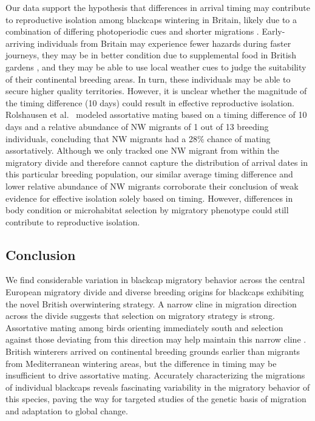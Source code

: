 \documentclass[a4paper, nobind]{templates/ociamthesis}
\begin{document}
Our data support the hypothesis that differences in arrival timing may contribute to reproductive isolation among blackcaps wintering in Britain, likely due to a combination of differing photoperiodic cues and shorter migrations \autocite{terrillEcophysiologicalAspectsRapid1990}.
Early-arriving individuals from Britain may experience fewer hazards during faster journeys, they may be in better condition due to supplemental food in British gardens \autocite{bearhopAssortativeMatingMechanism2005,plummerSupplementaryFeedingGardens2015}, and they may be able to use local weather cues to judge the suitability of their continental breeding areas.
In turn, these individuals may be able to secure higher quality territories.
However, it is unclear whether the magnitude of the timing difference (10 days) could result in effective reproductive isolation.
Rolshausen et al.~\autocite*{rolshausenSpringArrivalMigratory2010} modeled assortative mating based on a timing difference of 10 days and a relative abundance of NW migrants of 1 out of 13 breeding individuals, concluding that NW migrants had a 28\% chance of mating assortatively.
Although we only tracked one NW migrant from within the migratory divide and therefore cannot capture the distribution of arrival dates in this particular breeding population, our similar average timing difference and lower relative abundance of NW migrants corroborate their conclusion of weak evidence for effective isolation solely based on timing.
However, differences in body condition or microhabitat selection by migratory phenotype \autocite{rolshausenSpringArrivalMigratory2010} could still contribute to reproductive isolation.

\hypertarget{conclusion}{%
\subsection{Conclusion}\label{conclusion}}

We find considerable variation in blackcap migratory behavior across the central European migratory divide and diverse breeding origins for blackcaps exhibiting the novel British overwintering strategy. A narrow cline in migration direction across the divide suggests that selection on migratory strategy is strong. Assortative mating among birds orienting immediately south and selection against those deviating from this direction may help maintain this narrow cline \autocite[but see][]{irwinAssortativeMatingHybrid2020}. British winterers arrived on continental breeding grounds earlier than migrants from Mediterranean wintering areas, but the difference in timing may be insufficient to drive assortative mating. Accurately characterizing the migrations of individual blackcaps reveals fascinating variability in the migratory behavior of this species, paving the way for targeted studies of the genetic basis of migration and adaptation to global change.
\end{document}
